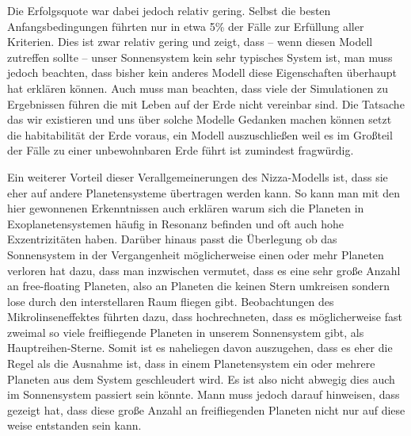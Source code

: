\documentclass[12pt,a4paper,twoside]{article}
\renewcommand{\cite}{\citep}
\begin{document}
Die Erfolgsquote war dabei jedoch relativ gering. Selbst die besten Anfangsbedingungen führten nur in etwa 5\% der Fälle zur Erfüllung aller Kriterien\cite{Nesvorny2012}. Dies ist zwar relativ gering und zeigt, dass -- wenn diesen Modell zutreffen sollte -- unser Sonnensystem kein sehr typisches System ist, man muss jedoch beachten, dass bisher kein anderes Modell diese Eigenschaften überhaupt hat erklären können.
Auch muss man beachten, dass viele der Simulationen zu Ergebnissen führen die mit Leben auf der Erde nicht vereinbar sind. Die Tatsache das wir existieren und uns über solche Modelle Gedanken machen können setzt die habitabilität der Erde voraus, ein Modell auszuschließen weil es im Großteil der Fälle zu einer unbewohnbaren Erde führt ist zumindest fragwürdig\cite{Brasser2009}.

Ein weiterer Vorteil dieser Verallgemeinerungen des Nizza-Modells ist, dass sie eher auf andere Planetensysteme übertragen werden kann. So kann man mit den hier gewonnenen Erkenntnissen auch erklären warum sich die Planeten in Exoplanetensystemen häufig in Resonanz befinden und oft auch hohe Exzentrizitäten haben\cite{Weidenschilling1996,Rasio1996,Marcy2001,Nesvorny2012}.
Darüber hinaus passt die Überlegung ob das Sonnensystem in der Vergangenheit möglicherweise einen oder mehr Planeten verloren hat dazu, dass man inzwischen vermutet, dass es eine sehr große Anzahl an free-floating Planeten, also an Planeten die keinen Stern umkreisen sondern lose durch den interstellaren Raum fliegen gibt. %
Beobachtungen des Mikrolinseneffektes führten dazu, dass \cite{Sumi2011} hochrechneten, dass es möglicherweise fast zweimal so viele freifliegende Planeten in unserem Sonnensystem gibt, als Hauptreihen-Sterne. %
Somit ist es naheliegen davon auszugehen, dass es eher die Regel als die Ausnahme ist, dass in einem Planetensystem ein oder mehrere Planeten aus dem System geschleudert wird. Es ist also nicht abwegig dies auch im Sonnensystem passiert sein könnte.
Mann muss jedoch darauf hinweisen, dass \cite{Veras2012} gezeigt hat, dass diese große Anzahl an freifliegenden Planeten nicht nur auf diese weise entstanden sein kann.
                                               
\end{document}
